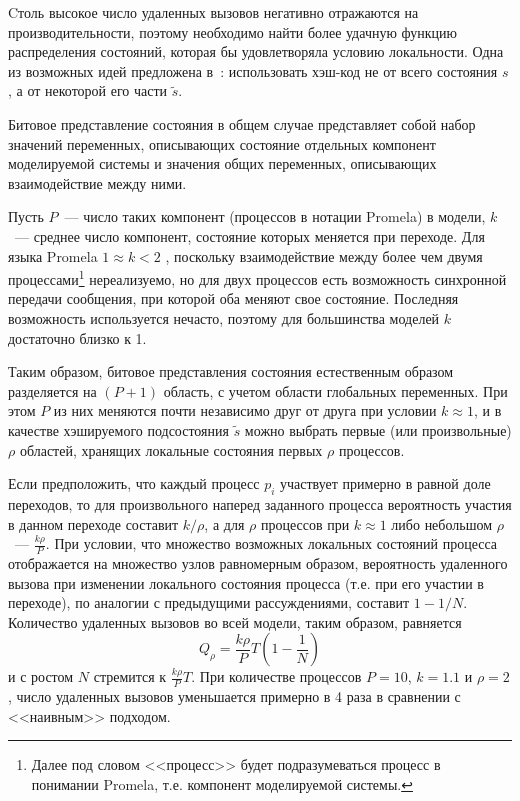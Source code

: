 \documentclass[12pt,a4paper,fleqn]{article}
\begin{document}
Cтоль высокое число удаленных вызовов негативно отражаются на производительности, поэтому необходимо найти более удачную
функцию распределения состояний, которая бы удовлетворяла условию локальности. Одна из возможных идей предложена
в~\cite{LS99}: использовать хэш-код не от всего состояния $s$, а от некоторой его части $\tilde{s}$.

Битовое представление состояния в общем случае представляет собой набор значений переменных, описывающих состояние
отдельных компонент моделируемой системы и значения общих переменных, описывающих взаимодействие между ними.

Пусть $P$~--- число таких компонент (процессов в нотации Promela) в модели, $k$~--- среднее число компонент, состояние
которых меняется при переходе. Для языка Promela $1 \approx k < 2$ , поскольку взаимодействие между более чем двумя
процессами\footnote{Далее под словом <<процесс>> будет подразумеваться процесс в понимании Promela, т.е. компонент
  моделируемой системы.} нереализуемо, но для двух процессов есть возможность синхронной передачи сообщения, при которой
оба меняют свое состояние. Последняя возможность используется нечасто, поэтому для большинства моделей $k$ достаточно
близко к 1.

Таким образом, битовое представления состояния естественным образом разделяется на $(P+1)$ область, с учетом области
глобальных переменных. При этом $P$ из них меняются почти независимо друг от друга при условии $k \approx 1$, и в
качестве хэшируемого подсостояния $\tilde{s}$ можно выбрать первые (или произвольные) $\rho$ областей, хранящих
локальные состояния первых $\rho$ процессов.

Если предположить, что каждый процесс $p_i$ участвует примерно в равной доле переходов, то для произвольного наперед
заданного процесса вероятность участия в данном переходе составит $k/\rho$, а для $\rho$ процессов при $k \approx 1$
либо небольшом $\rho$~--- $\frac{k \rho}{P}$. При условии, что множество возможных локальных состояний процесса
отображается на множество узлов равномерным образом, вероятность удаленного вызова при изменении локального состояния
процесса (т.е. при его участии в переходе), по аналогии с предыдущими рассуждениями, составит $1 - 1/N$. Количество
удаленных вызовов во всей модели, таким образом, равняется
\begin{equation}
  \label{eq:rpc-partproc}
  Q_\rho = \frac{k \rho}{P} T (1 - \frac{1}{N}) 
\end{equation}
и с ростом $N$ стремится к $\frac{k \rho}{P} T$. При количестве процессов $P = 10$, $k = 1.1$ и $\rho = 2$, число
удаленных вызовов уменьшается примерно в 4 раза в сравнении с <<наивным>> подходом.
\end{document}
